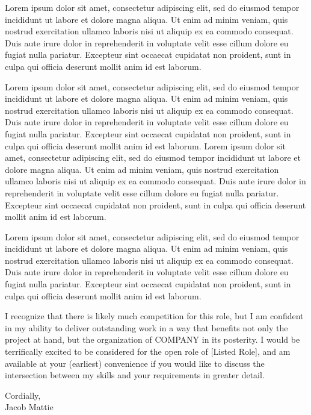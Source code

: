 \documentclass[a4paper,10pt]{article}
\begin{document}
\vspace{0.5em}

Lorem ipsum dolor sit amet, consectetur adipiscing elit, sed do eiusmod tempor incididunt ut labore et dolore magna aliqua. Ut enim ad minim veniam, quis nostrud exercitation ullamco laboris nisi ut aliquip ex ea commodo consequat. Duis aute irure dolor in reprehenderit in voluptate velit esse cillum dolore eu fugiat nulla pariatur. Excepteur sint occaecat cupidatat non proident, sunt in culpa qui officia deserunt mollit anim id est laborum.

\vspace{0.5em}

Lorem ipsum dolor sit amet, consectetur adipiscing elit, sed do eiusmod tempor incididunt ut labore et dolore magna aliqua. Ut enim ad minim veniam, quis nostrud exercitation ullamco laboris nisi ut aliquip ex ea commodo consequat. Duis aute irure dolor in reprehenderit in voluptate velit esse cillum dolore eu fugiat nulla pariatur. Excepteur sint occaecat cupidatat non proident, sunt in culpa qui officia deserunt mollit anim id est laborum. Lorem ipsum dolor sit amet, consectetur adipiscing elit, sed do eiusmod tempor incididunt ut labore et dolore magna aliqua. Ut enim ad minim veniam, quis nostrud exercitation ullamco laboris nisi ut aliquip ex ea commodo consequat. Duis aute irure dolor in reprehenderit in voluptate velit esse cillum dolore eu fugiat nulla pariatur. Excepteur sint occaecat cupidatat non proident, sunt in culpa qui officia deserunt mollit anim id est laborum. 

\vspace{0.5em}

Lorem ipsum dolor sit amet, consectetur adipiscing elit, sed do eiusmod tempor incididunt ut labore et dolore magna aliqua. Ut enim ad minim veniam, quis nostrud exercitation ullamco laboris nisi ut aliquip ex ea commodo consequat. Duis aute irure dolor in reprehenderit in voluptate velit esse cillum dolore eu fugiat nulla pariatur. Excepteur sint occaecat cupidatat non proident, sunt in culpa qui officia deserunt mollit anim id est laborum.

\vspace{0.5em}

I recognize that there is likely much competition for this role, but I am confident in my ability to deliver outstanding work in a way that benefits not only the project at hand, but the organization of COMPANY in its posterity. I would be terrifically excited to be considered for the open role of [Listed Role], and am available at your (earliest) convenience if you would like to discuss the intersection between my skills and your requirements in greater detail.


\vspace{1em}


\vspace{2em}
Cordially,\\

\vspace{2em}
Jacob Mattie
\end{document}
